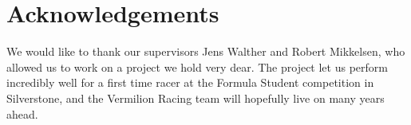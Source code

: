 \chapter*{Acknowledgements}

We would like to thank our supervisors Jens Walther and Robert Mikkelsen, who allowed us to work on a project we hold very dear. The project let us perform incredibly well for a first time racer at the Formula Student competition in Silverstone, and the Vermilion Racing team will hopefully live on many years ahead. 
